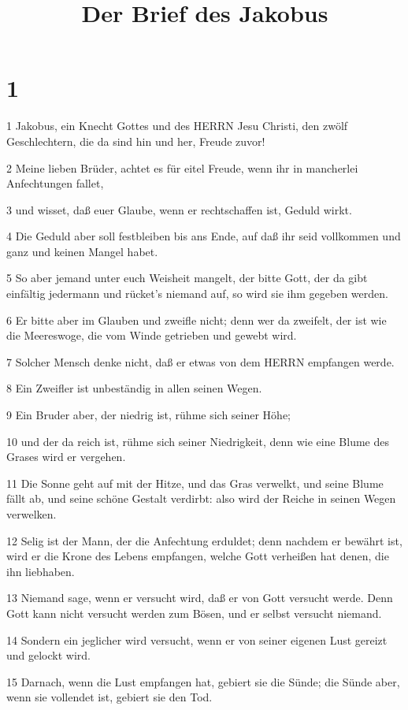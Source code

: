 

\title{Der Brief des Jakobus}


\chapter{1}

\par 1 Jakobus, ein Knecht Gottes und des HERRN Jesu Christi, den zwölf Geschlechtern, die da sind hin und her, Freude zuvor!
\par 2 Meine lieben Brüder, achtet es für eitel Freude, wenn ihr in mancherlei Anfechtungen fallet,
\par 3 und wisset, daß euer Glaube, wenn er rechtschaffen ist, Geduld wirkt.
\par 4 Die Geduld aber soll festbleiben bis ans Ende, auf daß ihr seid vollkommen und ganz und keinen Mangel habet.
\par 5 So aber jemand unter euch Weisheit mangelt, der bitte Gott, der da gibt einfältig jedermann und rücket's niemand auf, so wird sie ihm gegeben werden.
\par 6 Er bitte aber im Glauben und zweifle nicht; denn wer da zweifelt, der ist wie die Meereswoge, die vom Winde getrieben und gewebt wird.
\par 7 Solcher Mensch denke nicht, daß er etwas von dem HERRN empfangen werde.
\par 8 Ein Zweifler ist unbeständig in allen seinen Wegen.
\par 9 Ein Bruder aber, der niedrig ist, rühme sich seiner Höhe;
\par 10 und der da reich ist, rühme sich seiner Niedrigkeit, denn wie eine Blume des Grases wird er vergehen.
\par 11 Die Sonne geht auf mit der Hitze, und das Gras verwelkt, und seine Blume fällt ab, und seine schöne Gestalt verdirbt: also wird der Reiche in seinen Wegen verwelken.
\par 12 Selig ist der Mann, der die Anfechtung erduldet; denn nachdem er bewährt ist, wird er die Krone des Lebens empfangen, welche Gott verheißen hat denen, die ihn liebhaben.
\par 13 Niemand sage, wenn er versucht wird, daß er von Gott versucht werde. Denn Gott kann nicht versucht werden zum Bösen, und er selbst versucht niemand.
\par 14 Sondern ein jeglicher wird versucht, wenn er von seiner eigenen Lust gereizt und gelockt wird.
\par 15 Darnach, wenn die Lust empfangen hat, gebiert sie die Sünde; die Sünde aber, wenn sie vollendet ist, gebiert sie den Tod.
